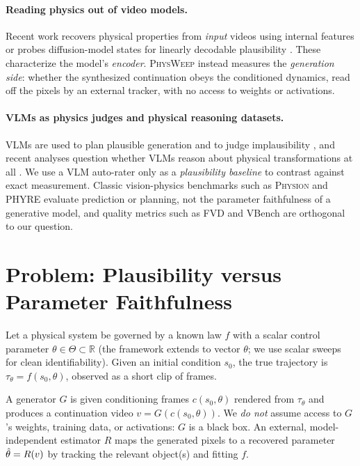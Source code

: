 \paragraph{Reading physics out of video models.}
Recent work recovers physical properties from \emph{input} videos using
internal features \citep{inferring2025dynamic} or probes diffusion-model
states for linearly decodable plausibility \citep{invisiblehand2026}. These
characterize the model's \emph{encoder}. \textsc{PhysWeep} instead measures the
\emph{generation side}: whether the synthesized continuation obeys the
conditioned dynamics, read off the pixels by an external tracker, with no
access to weights or activations.

\paragraph{VLMs as physics judges and physical reasoning datasets.}
VLMs are used to plan plausible generation \citep{vlipp2025} and to judge
implausibility \citep{travl2025}, and recent analyses question whether VLMs
reason about physical transformations at all \citep{vlmcannotreason2026}. We use
a VLM auto-rater only as a \emph{plausibility baseline} to contrast against exact
measurement. Classic vision-physics benchmarks such as \textsc{Physion} and
\textsc{PHYRE} \citep{bear2021physion,bakhtin2019phyre} evaluate prediction or
planning, not the parameter faithfulness of a generative model, and quality
metrics such as FVD and VBench \citep{unterthiner2018fvd,huang2024vbench} are
orthogonal to our question.

\section{Problem: Plausibility versus Parameter Faithfulness}
\label{sec:problem}

Let a physical system be governed by a known law $f$ with a scalar control
parameter $\theta \in \Theta \subset \mathbb{R}$ (the framework extends to
vector $\theta$; we use scalar sweeps for clean identifiability). Given an
initial condition $s_0$, the true trajectory is
$\tau_\theta = f(s_0,\theta)$, observed as a short clip of frames.

A generator $G$ is given conditioning frames $c(s_0,\theta)$ rendered from
$\tau_\theta$ and produces a continuation video $v = G(c(s_0,\theta))$. We
\emph{do not} assume access to $G$'s weights, training data, or activations:
$G$ is a black box. An external, model-independent estimator $R$ maps the
generated pixels to a recovered parameter $\hat{\theta} = R(v)$ by tracking the
relevant object(s) and fitting $f$.

